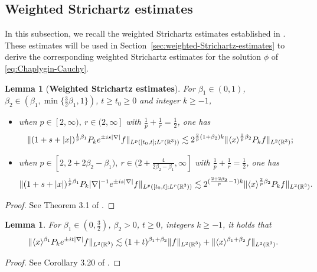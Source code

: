 \documentclass[11pt,twoside]{article}
\def\R{\mathop{\mathbb R\kern 0pt}\nolimits}
\def\f{\frac}
\def\ls{\lesssim}
\newcommand{\w}[1]{\langle {#1} \rangle}
\theoremstyle{plain}
\newtheorem{lemma}[theorem]{Lemma}
\theoremstyle{definition}
\theoremstyle{assumption}
\numberwithin{equation}{section}
\begin{document}
	

	
	
	
	
	\subsection{Weighted Strichartz estimates}
	\label{subsec:Weighted-linear-Strichartz-estimates}
	
	In this subsection, we recall the weighted Strichartz estimates established in
	\cite{GaoLiYin2026}. These estimates will be used in
	Section~\ref{sec:weighted-Strichartz-estimates} to derive the corresponding weighted
	Strichartz estimates for the solution $\phi$ of \eqref{eq:Chaplygin-Cauchy}.
	
	\begin{lemma}[{\bf Weighted Strichartz estimates}]\label{thm:Weighted Strichartz estimate}
		For $\beta_1\in(0,1)$, $\beta_2\in(\beta_1,\min\{\f32\beta_1,1\})$, $t\ge t_0\ge 0$ and integer $k\ge -1$,
		\begin{itemize}
			\item[(1)] when $p\in[2,\infty),\ r\in(2,\infty]$ with $\f1p+\f1r=\f12$, one has
			\begin{equation}\label{thm:Weighted Strichartz estimate 1}
				\|(1+s+|x|)^{\f{1}{p}\beta_1}P_{k}e^{\pm is|\nabla|}f\|_{L^p([t_0,t];L^r(\R^3))}
				\ls2^{\f2p(1+\beta_2)k }\|\w{x}^{\f2p \beta_2}P_kf\|_{L^2(\R^3)};
			\end{equation}
			\item[(2)] when $p\in[2,2+2\beta_2-\beta_1),\ r\in(2+\f{4}{2\beta_2-\beta_1},\infty]$ with $\f1p+\f1r=\f12$, one has
			\begin{equation}\label{thm:Weighted Strichartz estimate 2}
				\|(1+s+|x|)^{\f{1}{p}\beta_1}P_{k}|\nabla|^{-1}e^{\pm is|\nabla|}f\|_{L^p([t_0,t];L^r(\R^3))}
				\ls2^{(\f{2+2\beta_2}{p}-1)k }\|\w{x}^{\f2p \beta_2}P_kf\|_{L^2(\R^3)}.
			\end{equation}
		\end{itemize}
	\end{lemma}
	\begin{proof}
		See Theorem 3.1 of \cite{GaoLiYin2026}.
	\end{proof}
	
	
	\begin{lemma}\label{lem:weighted-L2-L2}
		For $\beta_1\in(0,\f32)$, $\beta_2>0$, $t\ge 0 $, integers $k\ge -1$, it holds that
		\begin{equation}\label{YHCCC-33}
			\begin{split}
				\|\w{x}^{\beta_1}P_k e^{\pm it|\nabla|}f\|_{L^2(\R^3)}
				\ls
				(1+t)^{\beta_1+\beta_2 }\|f\|_{L^2(\R^3)}
				+
				\|\w{x}^{\beta_1+\beta_2 } f\|_{L^2(\R^3)}.
			\end{split}
		\end{equation}
	\end{lemma}
	\begin{proof}
		See Corollary 3.20 of \cite{GaoLiYin2026}.
	\end{proof}
	
\end{document}
